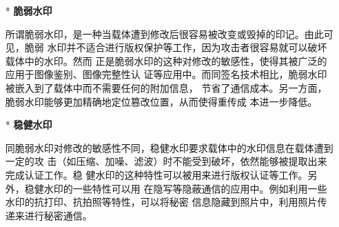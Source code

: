 \begin{itemize}
  \vspace{-10mm}
  \begin{itemize}
    \setlength{\parindent}{2em}
    \item[*] \textbf{脆弱水印}
    \vspace{-1mm}
    \par
    所谓脆弱水印，是一种当载体遭到修改后很容易被改变或毁掉的印记。由此可见，脆弱
    水印并不适合进行版权保护等工作，因为攻击者很容易就可以破坏载体中的水印。然而
    正是脆弱水印的这种对修改的敏感性，使得其被广泛的应用于图像鉴别、图像完整性认
    证等应用中。而同签名技术相比，脆弱水印被嵌入到了载体中而不需要任何的附加信息，
    节省了通信成本。另一方面，脆弱水印能够更加精确地定位篡改位置，从而使得重传成
    本进一步降低。
    \par
    \vspace{-2mm}
    \item[*] \textbf{稳健水印}
    \vspace{-1mm}
    \par
    同脆弱水印对修改的敏感性不同，稳健水印要求载体中的水印信息在载体遭到一定的攻
    击（如压缩、加噪、滤波）时不能受到破坏，依然能够被提取出来完成认证工作。稳
    健水印的这种特性可以被用来进行版权认证等工作。另外，稳健水印的一些特性可以用
    在隐写等隐蔽通信的应用中。例如利用一些水印的抗打印、抗拍照等特性，可以将秘密
    信息隐藏到照片中，利用照片传递来进行秘密通信。\\
  \end{itemize}
\end{itemize}




